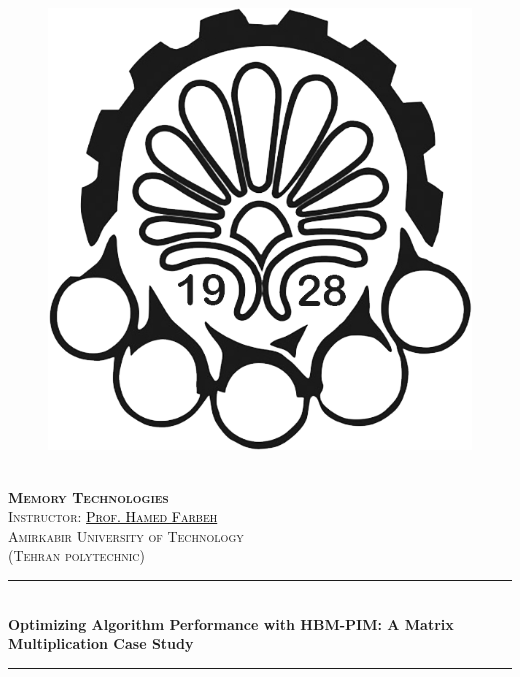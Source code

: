 \documentclass[12pt]{article}
\newcommand{\HRule}{\rule{\linewidth}{0.5mm}} %
\begin{document}
\begin{center}
    \begin{figure}
        \vspace{-1.0cm}
        \centering
        \includegraphics[scale = 0.35]{Images/AUT_logo.png} %
    \end{figure}
    \mbox{}\\[2.0cm]
    \textsc{\Huge \textbf{Memory Technologies}}\\[1.0cm]
    \textsc{\LARGE Instructor: \href{https://scholar.google.com/citations?user=PAZOYiAAAAAJ&hl=en}{\textcolor{black}{Prof. Hamed Farbeh}}}\\[2.5cm]
    \textsc{\LARGE Amirkabir University of Technology} \\%
    \textsc{(Tehran polytechnic)}
    \HRule\\[0.4cm]
    {\large \bf {\selectfont Optimizing Algorithm Performance with HBM-PIM: A Matrix Multiplication Case Study} }\\[0.2cm]
    \HRule\\[1.5cm]
\end{center}
\end{document}
